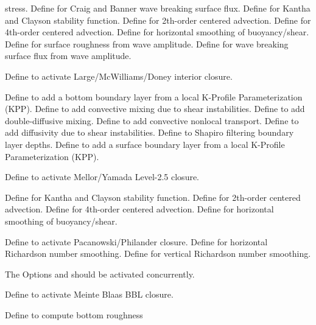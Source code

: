 \begin{klist}
\begin{klist}
\begin{klist}
       stress.
         Define for Craig and Banner wave breaking
       surface flux.
         Define for Kantha and Clayson stability
       function.
         Define for 2th-order centered advection.
         Define for 4th-order centered advection.
         Define for horizontal smoothing of
       buoyancy/shear.
         Define for surface roughness from wave
       amplitude.
         Define for wave breaking surface flux from
       wave amplitude.
    \end{klist}
       Define to activate Large/McWilliams/Doney
   interior closure.
    \begin{klist}
       Define to add a bottom boundary layer from a local
   K-Profile Parameterization (KPP).
       Define to add convective mixing due to shear
   instabilities.
       Define to add double-diffusive mixing.
      Define to add convective nonlocal transport.
       Define to add diffusivity due to shear
   instabilities.
       Define to Shapiro filtering boundary layer
   depths.
       Define to add a surface boundary layer from a local
   K-Profile Parameterization (KPP).
    \end{klist}
       Define to activate Mellor/Yamada Level-2.5
   closure.
    \begin{klist}
         Define for Kantha and Clayson stability
       function.
         Define for 2th-order centered advection.
         Define for 4th-order centered advection.
         Define for horizontal smoothing of
       buoyancy/shear.
    \end{klist}
       Define to activate Pacanowski/Philander
   closure.
       Define for horizontal Richardson number
   smoothing.
       Define for vertical Richardson number
   smoothing.
  \end{klist}
   \mbox{}
  The Options  and  should be activated concurrently.
    \begin{klist}
       Define to activate Meinte Blaas BBL closure.
      \begin{klist}
         Define to compute bottom roughness

\end{klist}
\end{klist}
\end{klist}
